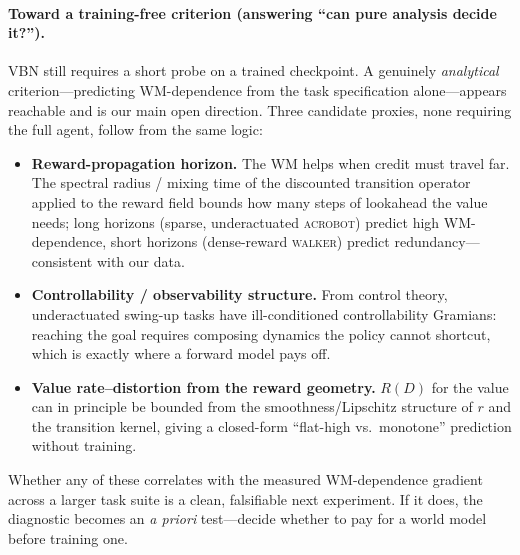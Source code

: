 \documentclass[letterpaper]{article}
\begin{document}
\paragraph{Toward a training-free criterion (answering ``can pure analysis
decide it?'').}
VBN still requires a short probe on a trained checkpoint. A genuinely
\emph{analytical} criterion---predicting WM-dependence from the task
specification alone---appears reachable and is our main open direction. Three
candidate proxies, none requiring the full agent, follow from the same logic:
\begin{itemize}\itemsep2pt
\item \textbf{Reward-propagation horizon.} The WM helps when credit must
travel far. The spectral radius / mixing time of the discounted transition
operator applied to the reward field bounds how many steps of lookahead the
value needs; long horizons (sparse, underactuated \textsc{acrobot}) predict
high WM-dependence, short horizons (dense-reward \textsc{walker}) predict
redundancy---consistent with our data.
\item \textbf{Controllability / observability structure.} From control theory,
underactuated swing-up tasks have ill-conditioned controllability Gramians:
reaching the goal requires composing dynamics the policy cannot shortcut,
which is exactly where a forward model pays off.
\item \textbf{Value rate--distortion from the reward geometry.} $R(D)$ for the
value can in principle be bounded from the smoothness/Lipschitz structure of
$r$ and the transition kernel, giving a closed-form ``flat-high vs.\ monotone''
prediction without training.
\end{itemize}
Whether any of these correlates with the measured WM-dependence gradient across
a larger task suite is a clean, falsifiable next experiment. If it does, the
diagnostic becomes an \emph{a priori} test---decide whether to pay for a world
model before training one.
\end{document}
